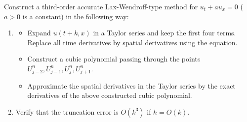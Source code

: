 \begin{exercise}
\label{applied:2022:5}
Construct a third-order accurate Lax-Wendroff-type method for $u_t + a u_x = 0$ ($a > 0$ is a constant) in the following way:
\begin{enumerate}[label=(\alph*)]
    \item 
    \begin{itemize}
        \item Expand $u(t + k, x)$ in a Taylor series and keep the first four terms. Replace all time derivatives by spatial derivatives using the equation.
        \item Construct a cubic polynomial passing through the points $U_{j-2}^n, U_{j-1}^n, U_j^n, U_{j+1}^n$.
        \item Approximate the spatial derivatives in the Taylor series by the exact derivatives of the above constructed cubic polynomial.
    \end{itemize}
    \item Verify that the truncation error is $O(k^3)$ if $h = O(k)$.
\end{enumerate}
\end{exercise}

